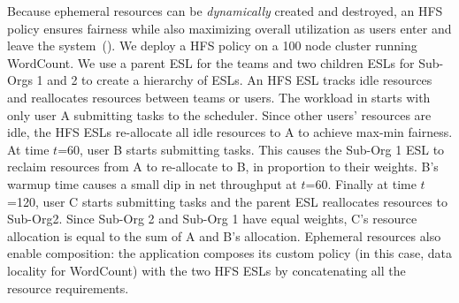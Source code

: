 Because ephemeral resources can be \emph{dynamically} created and destroyed, an HFS policy ensures fairness while also maximizing overall utilization as users enter and leave the system~().
We deploy a HFS policy on a 100 node cluster running WordCount. We use a parent ESL for the teams and two children ESLs for Sub-Orgs 1 and 2 to create a hierarchy of ESLs.
An HFS ESL tracks idle resources and reallocates resources between teams or users.
The workload in  starts with only user A submitting tasks to the scheduler. Since other users' resources are idle, the HFS ESLs re-allocate all idle resources to A to achieve max-min fairness. At time $t$=60, user B starts submitting tasks. This causes the Sub-Org 1 ESL to reclaim resources from A to re-allocate to B, in proportion to their weights. B's warmup time causes a small dip in net throughput at $t$=60. Finally at time $t$=120, user C starts submitting tasks and the parent ESL reallocates resources to Sub-Org2. Since Sub-Org 2 and Sub-Org 1 have equal weights, C's resource allocation is equal to the sum of A and B's allocation.
Ephemeral resources also enable composition: the application composes its custom policy (in this case, data locality for WordCount) with the two HFS ESLs by concatenating all the resource requirements.




